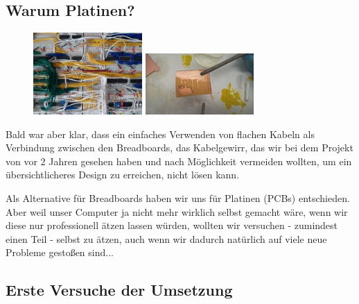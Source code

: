 \documentclass{scrartcl}
\begin{document}
    \subsection{Warum Platinen?}
    \vspace{-15pt}

        \begin{figure}
        \vspace{-40pt}
        \begin{center}
        \includegraphics[width=0.37\textwidth]{Computer_V01_Chaos_07}
        \includegraphics[width=0.37\textwidth,angle=0]{Handy/WP_20210704_20_54_21_Pro}
        \end{center}
        \vspace{-30pt}
        \end{figure}

    Bald war aber klar, dass ein einfaches Verwenden von flachen Kabeln als Verbindung zwischen den Breadboards, das Kabelgewirr, das wir bei dem Projekt von vor 2 Jahren gesehen haben
    und nach Möglichkeit vermeiden wollten, um ein übersichtlicheres Design zu erreichen, nicht lösen kann.

    Als Alternative für Breadboards haben wir uns für Platinen (PCBs) entschieden.
    Aber weil unser Computer ja nicht mehr wirklich selbst gemacht wäre, wenn wir diese nur professionell ätzen lassen würden,
    wollten wir versuchen - zumindest einen Teil - selbst zu ätzen, auch wenn wir dadurch natürlich auf viele neue Probleme gestoßen sind...


    \newpage

    \subsection{Erste Versuche der Umsetzung}
    \vspace{-15pt}
\end{document}
